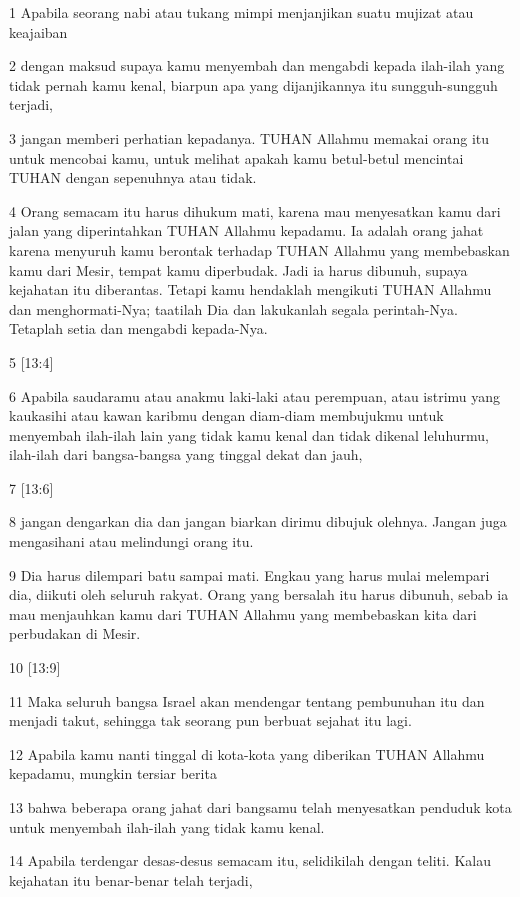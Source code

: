 \par 1 Apabila seorang nabi atau tukang mimpi menjanjikan suatu mujizat atau keajaiban
\par 2 dengan maksud supaya kamu menyembah dan mengabdi kepada ilah-ilah yang tidak pernah kamu kenal, biarpun apa yang dijanjikannya itu sungguh-sungguh terjadi,
\par 3 jangan memberi perhatian kepadanya. TUHAN Allahmu memakai orang itu untuk mencobai kamu, untuk melihat apakah kamu betul-betul mencintai TUHAN dengan sepenuhnya atau tidak.
\par 4 Orang semacam itu harus dihukum mati, karena mau menyesatkan kamu dari jalan yang diperintahkan TUHAN Allahmu kepadamu. Ia adalah orang jahat karena menyuruh kamu berontak terhadap TUHAN Allahmu yang membebaskan kamu dari Mesir, tempat kamu diperbudak. Jadi ia harus dibunuh, supaya kejahatan itu diberantas. Tetapi kamu hendaklah mengikuti TUHAN Allahmu dan menghormati-Nya; taatilah Dia dan lakukanlah segala perintah-Nya. Tetaplah setia dan mengabdi kepada-Nya.
\par 5 [13:4]
\par 6 Apabila saudaramu atau anakmu laki-laki atau perempuan, atau istrimu yang kaukasihi atau kawan karibmu dengan diam-diam membujukmu untuk menyembah ilah-ilah lain yang tidak kamu kenal dan tidak dikenal leluhurmu, ilah-ilah dari bangsa-bangsa yang tinggal dekat dan jauh,
\par 7 [13:6]
\par 8 jangan dengarkan dia dan jangan biarkan dirimu dibujuk olehnya. Jangan juga mengasihani atau melindungi orang itu.
\par 9 Dia harus dilempari batu sampai mati. Engkau yang harus mulai melempari dia, diikuti oleh seluruh rakyat. Orang yang bersalah itu harus dibunuh, sebab ia mau menjauhkan kamu dari TUHAN Allahmu yang membebaskan kita dari perbudakan di Mesir.
\par 10 [13:9]
\par 11 Maka seluruh bangsa Israel akan mendengar tentang pembunuhan itu dan menjadi takut, sehingga tak seorang pun berbuat sejahat itu lagi.
\par 12 Apabila kamu nanti tinggal di kota-kota yang diberikan TUHAN Allahmu kepadamu, mungkin tersiar berita
\par 13 bahwa beberapa orang jahat dari bangsamu telah menyesatkan penduduk kota untuk menyembah ilah-ilah yang tidak kamu kenal.
\par 14 Apabila terdengar desas-desus semacam itu, selidikilah dengan teliti. Kalau kejahatan itu benar-benar telah terjadi,
